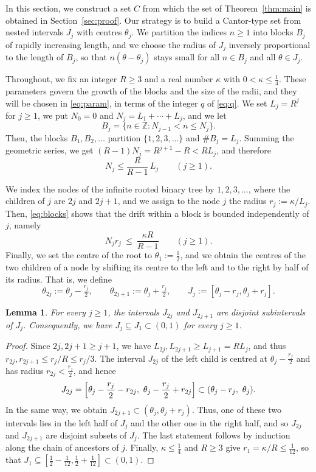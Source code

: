 \documentclass[11pt,reqno]{amsart}
\newtheorem{lemma}[theorem]{Lemma}
\theoremstyle{definition}
\theoremstyle{remark}
\numberwithin{equation}{section}
\newcommand{\Z}{\mathbb{Z}}
\begin{document}
In this section, we construct a set $C$ from which the set of Theorem~\ref{thm:main} is obtained in Section~\ref{sec:proof}. Our strategy is to build a Cantor-type set from nested intervals $J_j$ with centres $\theta_j$. We partition the indices $n\ge1$ into blocks $B_j$ of rapidly increasing length, and we choose the radius of $J_j$ inversely proportional to the length of $B_j$, so that $n(\theta-\theta_j)$ stays small for all $n\in B_j$ and all $\theta\in J_j$.

Throughout, we fix an integer $R\ge3$ and a real number $\kappa$ with $0<\kappa\le\tfrac14$. These parameters govern the growth of the blocks and the size of the radii, and they will be chosen in \eqref{eq:param}, in terms of the integer $q$ of \eqref{eq:q}. We set $L_j=R^j$ for $j\ge1$, we put $N_0=0$ and $N_j=L_1+\cdots+L_j$, and we let
\[
B_j=\{n\in\Z:N_{j-1}<n\le N_j\}.
\]
Then, the blocks $B_1,B_2,\dots$ partition $\{1,2,3,\dots\}$ and $\#B_j=L_j$. Summing the geometric series, we get $(R-1)N_j=R^{j+1}-R<RL_j$, and therefore
\begin{equation}\label{eq:blocks}
N_j\le\frac{R}{R-1}\,L_j\qquad(j\ge1).
\end{equation}

We index the nodes of the infinite rooted binary tree by $1,2,3,\dots$, where the children of $j$ are $2j$ and $2j+1$, and we assign to the node $j$ the radius $r_j:=\kappa/L_j$. Then, \eqref{eq:blocks} shows that the drift within a block is bounded independently of $j$, namely
\begin{equation}\label{eq:drift}
N_jr_j\ \le\ \frac{\kappa R}{R-1}\qquad(j\ge1).
\end{equation}
Finally, we set the centre of the root to $\theta_1:=\tfrac12$, and we obtain the centres of the two children of a node by shifting its centre to the left and to the right by half of its radius. That is, we define
\[
\theta_{2j}:=\theta_j-\tfrac{r_j}2,\qquad \theta_{2j+1}:=\theta_j+\tfrac{r_j}2,\qquad J_j:=[\theta_j-r_j,\theta_j+r_j].
\]

\begin{lemma}\label{lem:tree}
For every $j\ge1$, the intervals $J_{2j}$ and $J_{2j+1}$ are disjoint subintervals of $J_j$. Consequently, we have $J_j\subseteq J_1\subset(0,1)$ for every $j\ge1$.
\end{lemma}

\begin{proof}
Since $2j,2j+1\ge j+1$, we have $L_{2j},L_{2j+1}\ge L_{j+1}=RL_j$, and thus $r_{2j},r_{2j+1}\le r_j/R\le r_j/3$. The interval $J_{2j}$ of the left child is centred at $\theta_j-\tfrac{r_j}2$ and has radius $r_{2j}<\tfrac{r_j}2$, and hence
\[
J_{2j}=\Bigl[\theta_j-\frac{r_j}2-r_{2j},\ \theta_j-\frac{r_j}2+r_{2j}\Bigr]\subset(\theta_j-r_j,\ \theta_j).
\]
In the same way, we obtain $J_{2j+1}\subset(\theta_j,\theta_j+r_j)$. Thus, one of these two intervals lies in the left half of $J_j$ and the other one in the right half, and so $J_{2j}$ and $J_{2j+1}$ are disjoint subsets of $J_j$. The last statement follows by induction along the chain of ancestors of $j$. Finally, $\kappa\le\tfrac14$ and $R\ge3$ give $r_1=\kappa/R\le\tfrac1{12}$, so that $J_1\subseteq[\tfrac12-\tfrac1{12},\tfrac12+\tfrac1{12}]\subset(0,1)$.
\end{proof}
\end{document}

